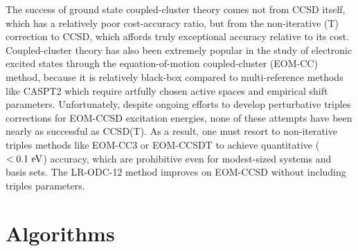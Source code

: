 The success of ground state coupled-cluster theory comes not from CCSD
itself, which has a relatively poor cost-accuracy ratio, but from the
non-iterative (T) correction to CCSD, which affords truly exceptional
accuracy relative to its cost.\cite{Stanton:1997p130}
Coupled-cluster theory has also been extremely popular in the study of
electronic excited states through the equation-of-motion coupled-cluster
(EOM-CC) method,\cite{Krylov:2008p433} because it is relatively
black-box compared to multi-reference methods like
CASPT2\cite{Andersson:1992p1218} which require artfully chosen active
spaces and empirical shift parameters.\cite{Zobel:2017p1482}
Unfortunately, despite ongoing efforts to develop perturbative triples
corrections for EOM-CCSD excitation energies, none of these attempts
have been nearly as successful as CCSD(T).\cite{Matthews:2016p124102}
As a result, one must resort to non-iterative triples methods like
EOM-CC3\cite{Koch:1998p1808} or EOM-CCSDT\cite{Hirata:2000p255} to
achieve quantitative (\(<0.1~\mathrm{eV}\)) accuracy, which are prohibitive even
for modest-sized systems and basis sets.
The LR-ODC-12 method improves on EOM-CCSD without including triples
parameters.


\section{Algorithms}
\label{sec:algorithms}

